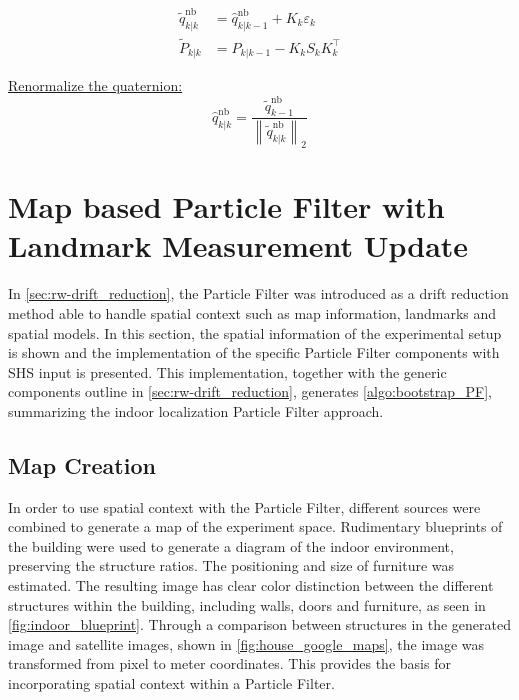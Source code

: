 \begin{algorithm}[H]
{\begin{subequations}
			
			\begin{align}
				\tilde{q}_{k | k}^{\mathrm{nb}} &=\hat{q}_{k | k-1}^{\mathrm{nb}}+K_{k} \varepsilon_{k} \\
				\tilde{P}_{k | k} &=P_{k | k-1}-K_{k} S_{k} K_{k}^{\top}
			\end{align}
			
		\end{subequations}		
		
		\underline{Renormalize the quaternion:}
		\begin{equation}
			\hat{q}_{k | k}^{\mathrm{nb}}=\frac{\tilde{q}_{k-1}^{\mathrm{nb}}}{\left\|\tilde{q}_{k | k}^{\mathrm{nb}}\right\|_{2}}
		\end{equation}		
	}	
\end{algorithm}
\restoregeometry
\section{Map based Particle Filter with Landmark Measurement Update}
\label{sec:method-particle_filter}
In \cref{sec:rw-drift_reduction}, the Particle Filter was introduced as a drift reduction method able to handle spatial context such as map information, landmarks and spatial models. In this section, the spatial information of the experimental setup is shown and the implementation of the specific Particle Filter components with \ac{SHS} input is presented. This implementation, together with the generic components outline in \cref{sec:rw-drift_reduction}, generates 
\cref{algo:bootstrap_PF}, summarizing the indoor localization Particle Filter approach.

\subsection{Map Creation}
In order to use spatial context with the Particle Filter, different sources were combined to generate a map of the experiment space. Rudimentary blueprints of the building were used to generate a diagram of the indoor environment, preserving the structure ratios. The positioning and size of furniture was estimated. The resulting image has clear color distinction between the different structures within the building, including walls, doors and furniture, as seen in \cref{fig:indoor_blueprint}. Through a comparison between structures in the generated image and satellite images, shown in \cref{fig:house_google_maps}, the image was transformed from pixel to meter coordinates. This provides the basis for incorporating spatial context within a Particle Filter.

